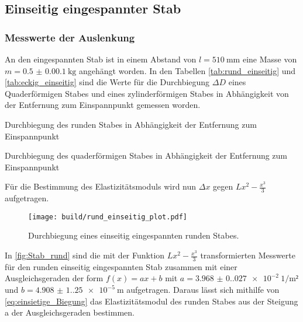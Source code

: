 \subsection{Einseitig eingespannter Stab}

\subsubsection{Messwerte der Auslenkung}

An den eingespannten Stab ist in einem Abstand von $l=\qty{510}{\milli\meter}$ eine Masse von $m=\qty{0.5(0.001)}{\kilo\gram}$
angehängt worden. In den Tabellen \ref{tab:rund_einseitig} und \ref{tab:eckig_einseitig} sind die Werte für die Durchbiegung $\Delta D$ eines
Quaderförmigen Stabes und eines zylinderförmigen Stabes in Abhängigkeit von der Entfernung zum Einspannpunkt
gemessen worden.
\begin{table}[H]
  \centering
  \begin{minipage}[b]{0.5\textwidth}
    \centering
    
    \caption{Durchbiegung des runden Stabes in Abhängigkeit der Entfernung zum Einspannpunkt}
    \label{tab:rund_einseitig}
  \end{minipage}
  \hfill
  \begin{minipage}[b]{0.5\textwidth}
    \centering
    
    \caption{Durchbiegung des quaderförmigen Stabes in Abhängigkeit der Entfernung zum Einspannpunkt}
    \label{tab:eckig_einseitig}
  \end{minipage}
\end{table}

\noindent Für die Bestimmung des Elastizitätsmoduls wird nun $\Delta x$ gegen $Lx^2 -\frac{x^3}{3}$ aufgetragen.

\begin{figure}[H]
  \centering
  \texttt{[image: build/rund\_einseitig\_plot.pdf]}
  \caption{Durchbiegung eines einseitig eingespannten runden Stabes.}
  \label{fig:Stab_rund}
\end{figure}

\noindent In \autoref{fig:Stab_rund} sind die mit der Funktion $Lx^2-\frac{x^3}{3}$ transformierten Messwerte für den runden einseitig eingespannten Stab zusammen mit einer Ausgleichsgeraden der form $f(x)=ax+b$ mit $a=\SI{3.968(0.027)e-2}{1\per\meter²}$ und $b=\SI{4.908(1.25)e-5}{\meter}$ aufgetragen. Daraus lässt sich mithilfe von \autoref{eq:einsietige_Biegung} das Elastizitätsmodul des runden Stabes aus der Steigung a der Ausgleichsgeraden bestimmen.

